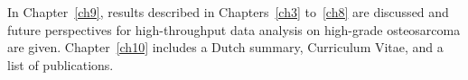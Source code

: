 In Chapter~\ref{ch9}, results described in Chapters~\ref{ch3} to~\ref{ch8} are discussed and future perspectives for high\hyp{}throughput data analysis on high\hyp{}grade osteosarcoma are given. Chapter~\ref{ch10} includes a Dutch summary, Curriculum Vitae, and a list of publications.



\begin{small}
\begin{singlespace}

\end{singlespace}
\end{small}

%